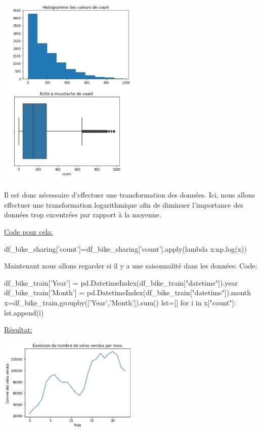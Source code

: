 \documentclass[a4paper,oneside,11pt]{article}
\begin{document}
\includegraphics[width=0.5\textwidth]{image_rapport/analyse_count}

Il est donc nécessaire d'effectuer une transformation des données. Ici, nous allons effectuer une transformation logarithmique afin de diminuer l'importance des données trop excentrées par rapport à la moyenne.

\underline{Code pour cela:}

\begin{code-Python}
df_bike_sharing['count']=df_bike_sharing['count'].apply(lambda x:np.log(x))
\end{code-Python}

Maintenant nous allons regarder si il y a une saisonnalité dans les données:
Code:
\begin{code-Python}
df_bike_train['Year'] = pd.DatetimeIndex(df_bike_train["datetime"]).year
df_bike_train['Month'] = pd.DatetimeIndex(df_bike_train["datetime"]).month
x=df_bike_train.groupby(['Year','Month']).sum()
lst=[]
for i in x["count"]:
    lst.append(i) 
\end{code-Python}

\underline{Résultat:}

\includegraphics[width=0.5\textwidth]{image_rapport/saisonnalite}
\end{document}
